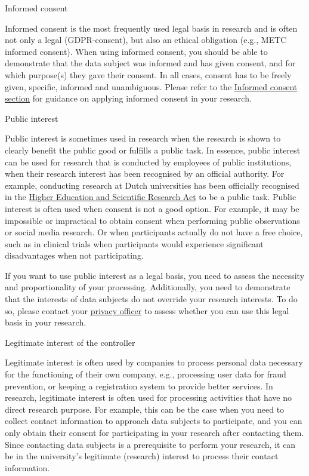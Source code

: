 \documentclass[
]{book}
\begin{document}
Informed consent

Informed consent is the most frequently used legal basis in research and
is often not only a legal (GDPR-consent), but also an ethical obligation
(e.g., METC informed consent). When using informed consent, you should
be able to demonstrate that the data subject was informed and has given
consent, and for which purpose(s) they gave their consent. In all cases,
consent has to be freely given, specific, informed and unambiguous. Please
refer to the \protect\hyperlink{informed-consent-forms}{Informed consent section} for
guidance on applying informed consent in your research.

Public interest

Public interest is sometimes used in research when the research is shown
to clearly benefit the public good or fulfills a public task. In
essence, public interest can be used for research that is conducted by
employees of public institutions, when their research interest has been
recognised by an official authority. For example, conducting research at
Dutch universities has been officially recognised in the
\href{https://wetten.overheid.nl/BWBR0005682/2022-01-01}{Higher Education and Scientific Research Act}
to be a public task. Public interest is often used when consent is not
a good option. For example, it may be impossible or impractical to
obtain consent when performing public observations or social media
research. Or when participants actually do not have a free choice, such
as in clinical trials when participants would experience significant
disadvantages when not participating.

If you want to use public interest as a legal basis, you
need to assess the necessity and proportionality of your processing.
Additionally, you need to demonstrate that the interests of data
subjects do not override your research interests. To do so, please contact
your \protect\hyperlink{support}{privacy officer} to assess whether you can use this
legal basis in your research.

Legitimate interest of the controller

Legitimate interest is often used by companies to process personal data
necessary for the functioning of their own company, e.g., processing
user data for fraud prevention, or keeping a registration system to
provide better services. In research, legitimate interest is often used
for processing activities that have no direct research purpose. For
example, this can be the case when you need to collect contact
information to approach data subjects to participate, and you can only
obtain their consent for participating in your research after contacting
them. Since contacting data subjects is a prerequisite to perform your
research, it can be in the university's legitimate (research) interest
to process their contact information.
\end{document}
